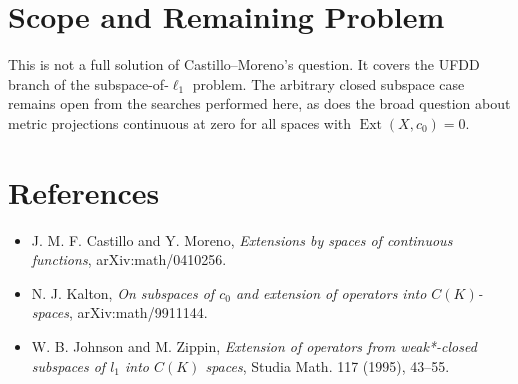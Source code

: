 \documentclass[11pt]{article}
\newcommand{\Ext}{\operatorname{Ext}}
\begin{document}
\section*{Scope and Remaining Problem}

This is not a full solution of Castillo--Moreno's question.  It covers the
UFDD branch of the subspace-of-\(\ell_1\) problem.  The arbitrary closed
subspace case remains open from the searches performed here, as does the broad
question about metric projections continuous at zero for all spaces with
\(\Ext(X,c_0)=0\).

\section*{References}

\begin{itemize}
\item J. M. F. Castillo and Y. Moreno, \emph{Extensions by spaces of continuous
functions}, arXiv:math/0410256.
\item N. J. Kalton, \emph{On subspaces of \(c_0\) and extension of operators
into \(C(K)\)-spaces}, arXiv:math/9911144.
\item W. B. Johnson and M. Zippin, \emph{Extension of operators from
weak*-closed subspaces of \(l_1\) into \(C(K)\) spaces}, Studia Math. 117
(1995), 43--55.
\end{itemize}
\end{document}
